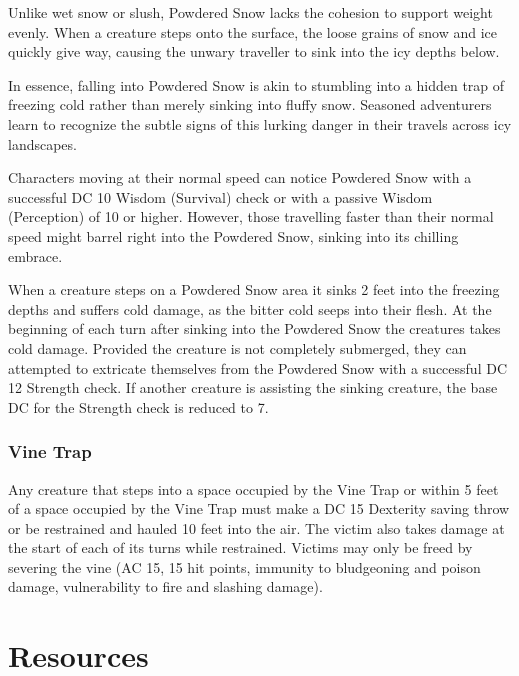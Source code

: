Unlike wet snow or slush, Powdered Snow lacks the cohesion to support weight evenly. When a creature steps onto the surface, the loose grains of snow and ice quickly give way, causing the unwary traveller to sink into the icy depths below.

In essence, falling into Powdered Snow is akin to stumbling into a hidden trap of freezing cold rather than merely sinking into fluffy snow. Seasoned adventurers learn to recognize the subtle signs of this lurking danger in their travels across icy landscapes.

Characters moving at their normal speed can notice Powdered Snow with a successful DC 10 Wisdom (Survival) check or with a passive Wisdom (Perception) of 10 or higher. However, those travelling faster than their normal speed might barrel right into the Powdered Snow, sinking into its chilling embrace.

When a creature steps on a Powdered Snow area it sinks 2 feet into the freezing depths and suffers  cold damage, as the bitter cold seeps into their flesh. At the beginning of each turn after sinking into the Powdered Snow the creatures takes  cold damage. Provided the creature is not completely submerged, they can attempted to extricate themselves from the Powdered Snow with a successful DC 12 Strength check. If another creature is assisting the sinking creature, the base DC for the Strength check is reduced to 7.
\subsection*{Vine Trap}
\label{sec:VineTrap}
Any creature that steps into a space occupied by the Vine Trap or within 5 feet of a space occupied by the Vine Trap must make a DC 15 Dexterity saving throw or be restrained and hauled 10 feet into the air. The victim also takes  damage at the start of each of its turns while restrained. Victims may only be freed by severing the vine (AC 15, 15 hit points, immunity to bludgeoning and poison damage, vulnerability to fire and slashing damage).

\onecolumn
\chapter{Resources}
